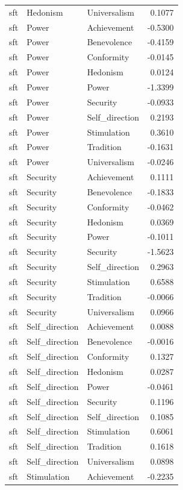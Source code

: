 \begin{tabular}{lllr}
sft & Hedonism & Universalism & 0.1077 \\
sft & Power & Achievement & -0.5300 \\
sft & Power & Benevolence & -0.4159 \\
sft & Power & Conformity & -0.0145 \\
sft & Power & Hedonism & 0.0124 \\
sft & Power & Power & -1.3399 \\
sft & Power & Security & -0.0933 \\
sft & Power & Self\_direction & 0.2193 \\
sft & Power & Stimulation & 0.3610 \\
sft & Power & Tradition & -0.1631 \\
sft & Power & Universalism & -0.0246 \\
sft & Security & Achievement & 0.1111 \\
sft & Security & Benevolence & -0.1833 \\
sft & Security & Conformity & -0.0462 \\
sft & Security & Hedonism & 0.0369 \\
sft & Security & Power & -0.1011 \\
sft & Security & Security & -1.5623 \\
sft & Security & Self\_direction & 0.2963 \\
sft & Security & Stimulation & 0.6588 \\
sft & Security & Tradition & -0.0066 \\
sft & Security & Universalism & 0.0966 \\
sft & Self\_direction & Achievement & 0.0088 \\
sft & Self\_direction & Benevolence & -0.0016 \\
sft & Self\_direction & Conformity & 0.1327 \\
sft & Self\_direction & Hedonism & 0.0287 \\
sft & Self\_direction & Power & -0.0461 \\
sft & Self\_direction & Security & 0.1196 \\
sft & Self\_direction & Self\_direction & 0.1085 \\
sft & Self\_direction & Stimulation & 0.6061 \\
sft & Self\_direction & Tradition & 0.1618 \\
sft & Self\_direction & Universalism & 0.0898 \\
sft & Stimulation & Achievement & -0.2235 \\

\end{tabular}
